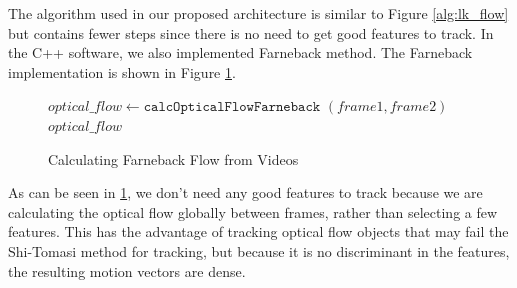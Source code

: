 The algorithm used in our proposed architecture is similar to Figure \ref{alg:lk_flow} but
contains fewer steps since there is no need to get good features to track.
In the C++ software, we also implemented Farneback method. The
Farneback implementation is shown in Figure \ref{alg:farneback}.

\begin{figure}[h]
\begin{algorithmic}[1]
  \State $optical\_flow \gets \texttt{calcOpticalFlowFarneback}$
  \Statex $(frame1, frame2)$\\
  \Return $optical\_flow$
\EndProcedure
\end{algorithmic}
\caption{Calculating Farneback Flow from Videos}
\label{alg:farneback}
\end{figure}

As can be seen in \ref{alg:farneback}, we don't need any good features to track
because we are calculating the optical flow globally between frames, rather than
selecting a few features. This has the advantage of tracking optical flow objects
that may fail the Shi-Tomasi method for tracking, but because it is no discriminant
in the features, the resulting motion vectors are dense.



